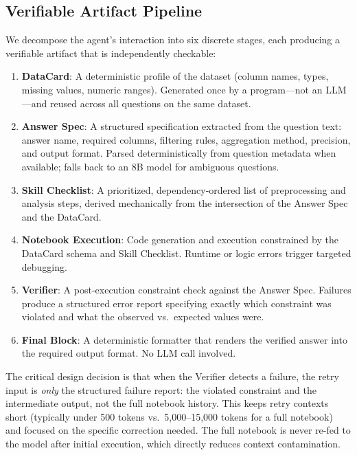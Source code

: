 \documentclass[letterpaper]{article} %
\begin{document}
\subsection{Verifiable Artifact Pipeline}

We decompose the agent's interaction into six discrete stages, each producing a verifiable artifact that is independently checkable:

\begin{enumerate}
    \item \textbf{DataCard}: A deterministic profile of the dataset (column names, types, missing values, numeric ranges). Generated once by a program---not an LLM---and reused across all questions on the same dataset.
    \item \textbf{Answer Spec}: A structured specification extracted from the question text: answer name, required columns, filtering rules, aggregation method, precision, and output format. Parsed deterministically from question metadata when available; falls back to an 8B model for ambiguous questions.
    \item \textbf{Skill Checklist}: A prioritized, dependency-ordered list of preprocessing and analysis steps, derived mechanically from the intersection of the Answer Spec and the DataCard.
    \item \textbf{Notebook Execution}: Code generation and execution constrained by the DataCard schema and Skill Checklist. Runtime or logic errors trigger targeted debugging.
    \item \textbf{Verifier}: A post-execution constraint check against the Answer Spec. Failures produce a structured error report specifying exactly which constraint was violated and what the observed vs.\ expected values were.
    \item \textbf{Final Block}: A deterministic formatter that renders the verified answer into the required output format. No LLM call involved.
\end{enumerate}

The critical design decision is that when the Verifier detects a failure, the retry input is \textit{only} the structured failure report: the violated constraint and the intermediate output, not the full notebook history. This keeps retry contexts short (typically under 500 tokens vs.\ 5,000--15,000 tokens for a full notebook) and focused on the specific correction needed. The full notebook is never re-fed to the model after initial execution, which directly reduces context contamination.
\end{document}
